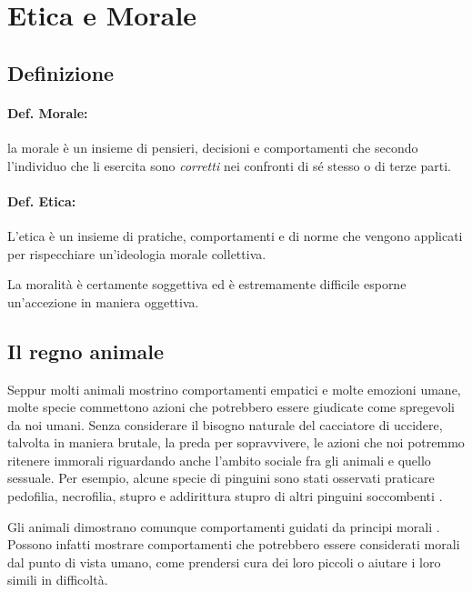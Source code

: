 \documentclass[a4paper, 12pt]{article}
\begin{document}
\pagebreak

\section{Etica e Morale}

\subsection{Definizione}

\paragraph{Def. Morale:}
la morale è un insieme di pensieri, decisioni e comportamenti che secondo l'individuo
che li esercita sono \textit{corretti} nei confronti di sé stesso o di terze parti.

\paragraph{Def. Etica:}
L'etica è un insieme di pratiche, comportamenti e di norme che vengono applicati
per rispecchiare un'ideologia morale collettiva.

La moralità è certamente soggettiva ed è estremamente
difficile esporne un'accezione in maniera oggettiva.

\subsection{Il regno animale}

Seppur molti animali mostrino comportamenti empatici e molte emozioni umane,
molte specie commettono azioni che potrebbero essere giudicate come spregevoli da noi umani.
Senza considerare il bisogno naturale del cacciatore di uccidere, talvolta in maniera brutale,
la preda per sopravvivere, le azioni che noi potremmo ritenere immorali
riguardando anche l'ambito sociale fra gli animali e quello sessuale.
Per esempio, alcune specie di pinguini sono stati osservati praticare
pedofilia, necrofilia, stupro e addirittura stupro di altri pinguini soccombenti
\cite{penguins}.

Gli animali dimostrano comunque comportamenti guidati da principi morali
\cite{rowlands2012oxford} \cite{rowlands2015can} \cite{andrews2018routledge}.
Possono infatti mostrare comportamenti che potrebbero essere considerati morali dal punto di vista umano,
come prendersi cura dei loro piccoli o aiutare i loro simili in difficoltà.
\end{document}
